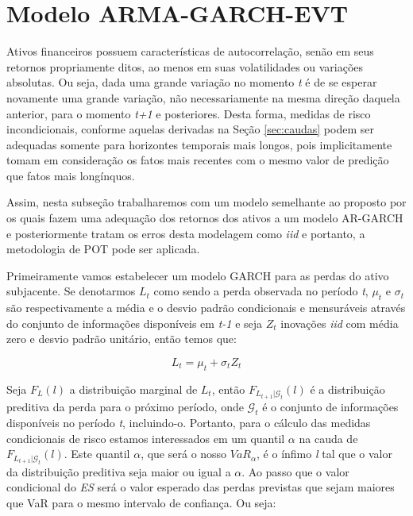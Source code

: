 \documentclass[review]{elsarticle}
\theoremstyle{definition}
\begin{document}
\section{Modelo ARMA-GARCH-EVT}
\label{sec:armagarchevt}

Ativos financeiros possuem características de autocorrelação, senão em seus retornos propriamente ditos, ao menos em suas volatilidades ou variações absolutas. Ou seja, dada uma grande variação no momento \emph{t} é de se esperar novamente uma grande variação, não necessariamente na mesma direção daquela anterior, para o momento \emph{t+1} e posteriores. Desta forma, medidas de risco incondicionais, conforme aquelas derivadas na Seção \ref{sec:caudas} podem ser adequadas somente para horizontes temporais mais longos, pois implicitamente tomam em consideração os fatos mais recentes com o mesmo valor de predição que fatos mais longínquos.

Assim, nesta subseção trabalharemos com um modelo semelhante ao proposto por \cite{McNeil2000} os quais fazem uma adequação dos retornos dos ativos a um modelo AR-GARCH e posteriormente tratam os erros desta modelagem como \emph{iid} e portanto, a metodologia de POT pode ser aplicada.

Primeiramente vamos estabelecer um modelo GARCH para as perdas do ativo subjacente. Se denotarmos $L_t$ como sendo a perda observada no período \emph{t}, $\mu_t$ e $\sigma_t$ são respectivamente a média e o desvio padrão condicionais e mensuráveis através do conjunto de informações disponíveis em \emph{t-1} e seja $Z_t$ inovações \emph{iid} com média zero e desvio padrão unitário, então temos que:

\begin{equation}
\label{eq:loss}
L_t=\mu_t+\sigma_t Z_t
\end{equation}

Seja $F_L(l)$ a distribuição marginal de $L_t$, então $F_{L_{t+1} | \mathcal{G}_t}(l)$ é a distribuição preditiva da perda para o próximo período, onde $\mathcal{G}_t$ é o conjunto de informações disponíveis no período \emph{t}, incluindo-o. Portanto, para o cálculo das medidas condicionais de risco estamos interessados em um quantil $\alpha$ na cauda de $F_{L_{t+1} | \mathcal{G}_t}(l)$. Este quantil $\alpha$, que será o nosso $VaR_\alpha$, é o ínfimo \emph{l} tal que o valor da distribuição preditiva seja maior ou igual a $\alpha$. Ao passo que o valor condicional do \emph{ES} será o valor esperado das perdas previstas que sejam maiores que VaR para o mesmo intervalo de confiança. Ou seja:
\end{document}

